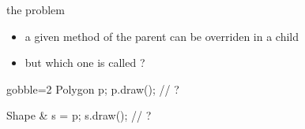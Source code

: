 \begin{frame}[fragile]
  \begin{block}{the problem}
    \begin{itemize}
    \item a given method of the parent can be overriden in a child
    \item but which one is called ?
    \end{itemize}
  \end{block}
  \begin{multicols}{2}
    \begin{cppcode*}{gobble=2}
      Polygon p;
      p.draw(); // ?

      Shape & s = p;
      s.draw(); // ?
    \end{cppcode*}
    \columnbreak
    \center
  \end{multicols}
\end{frame}


